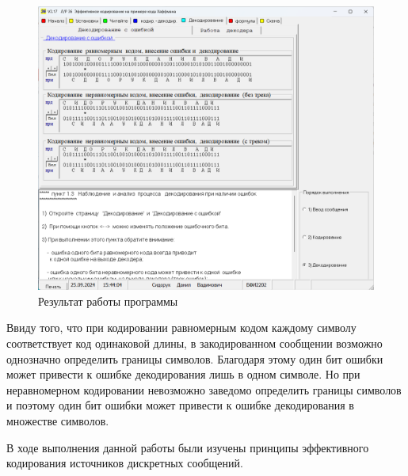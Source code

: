 \documentclass[14pt]{extarticle}
\makeatletter
\newcounter{sectionc} %
\newcommand{\nonumbersections}{\renewcommand{\Hy@numberline}[1]{}}
\let\oldsectionc\sectionc
\renewcommand{\sectionc}{\nonumbersections\oldsectionc}
\makeatother
\begin{document}
\begin{figure}[H]
    \centering
    \includegraphics[width=1.0\linewidth]{ДекодированиеСОшибкой.png}
    \caption{Результат работы программы\label{img:ДекодированиеСОшибкой}}
\end{figure}

Ввиду того, что при кодировании равномерным кодом каждому символу соответствует код одинаковой длины, в закодированном сообщении возможно однозначно определить границы символов. Благодаря этому один бит ошибки может привести к ошибке декодирования лишь в одном символе. Но при неравномерном кодировании невозможно заведомо определить границы символов и поэтому один бит ошибки может привести к ошибке декодирования в множестве символов.


В ходе выполнения данной работы были изучены принципы эффективного кодирования источников дискретных сообщений.
\end{document}
